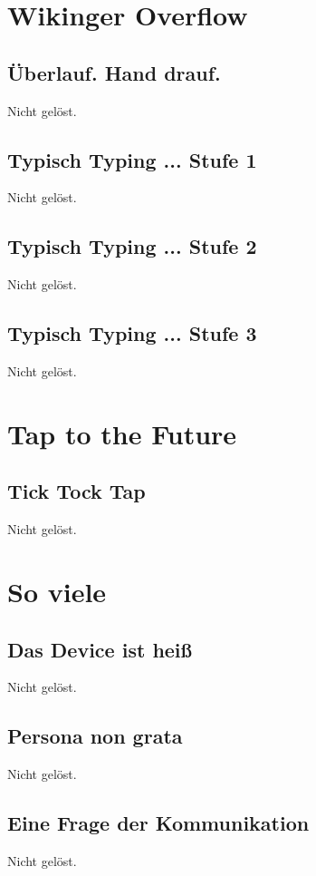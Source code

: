 \documentclass[12pt,a4paper,titlepage,oneside]{scrartcl}
\begin{document}
\section{Wikinger Overflow}

\subsection{\"Uberlauf. Hand drauf.}
Nicht gelöst.

\subsection{Typisch Typing ... Stufe 1}
Nicht gelöst.

\subsection{Typisch Typing ... Stufe 2}
Nicht gelöst.

\subsection{Typisch Typing ... Stufe 3}
Nicht gelöst.


\section{Tap to the Future}

\subsection{Tick Tock Tap}
Nicht gelöst.


\section{So viele}

\subsection{Das Device ist heiß}
Nicht gelöst.

\subsection{Persona non grata}
Nicht gelöst.

\subsection{Eine Frage der Kommunikation}
Nicht gelöst.
\end{document}
